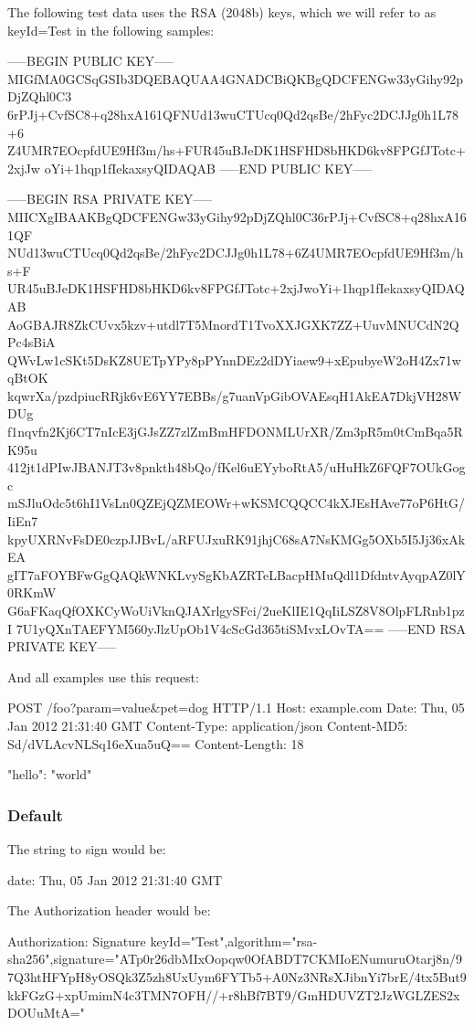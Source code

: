 The following test data uses the R\+S\+A (2048b) keys, which we will refer to as {\ttfamily key\+Id=Test} in the following samples\+: \begin{DoxyVerb}-----BEGIN PUBLIC KEY-----
MIGfMA0GCSqGSIb3DQEBAQUAA4GNADCBiQKBgQDCFENGw33yGihy92pDjZQhl0C3
6rPJj+CvfSC8+q28hxA161QFNUd13wuCTUcq0Qd2qsBe/2hFyc2DCJJg0h1L78+6
Z4UMR7EOcpfdUE9Hf3m/hs+FUR45uBJeDK1HSFHD8bHKD6kv8FPGfJTotc+2xjJw
oYi+1hqp1fIekaxsyQIDAQAB
-----END PUBLIC KEY-----

-----BEGIN RSA PRIVATE KEY-----
MIICXgIBAAKBgQDCFENGw33yGihy92pDjZQhl0C36rPJj+CvfSC8+q28hxA161QF
NUd13wuCTUcq0Qd2qsBe/2hFyc2DCJJg0h1L78+6Z4UMR7EOcpfdUE9Hf3m/hs+F
UR45uBJeDK1HSFHD8bHKD6kv8FPGfJTotc+2xjJwoYi+1hqp1fIekaxsyQIDAQAB
AoGBAJR8ZkCUvx5kzv+utdl7T5MnordT1TvoXXJGXK7ZZ+UuvMNUCdN2QPc4sBiA
QWvLw1cSKt5DsKZ8UETpYPy8pPYnnDEz2dDYiaew9+xEpubyeW2oH4Zx71wqBtOK
kqwrXa/pzdpiucRRjk6vE6YY7EBBs/g7uanVpGibOVAEsqH1AkEA7DkjVH28WDUg
f1nqvfn2Kj6CT7nIcE3jGJsZZ7zlZmBmHFDONMLUrXR/Zm3pR5m0tCmBqa5RK95u
412jt1dPIwJBANJT3v8pnkth48bQo/fKel6uEYyboRtA5/uHuHkZ6FQF7OUkGogc
mSJluOdc5t6hI1VsLn0QZEjQZMEOWr+wKSMCQQCC4kXJEsHAve77oP6HtG/IiEn7
kpyUXRNvFsDE0czpJJBvL/aRFUJxuRK91jhjC68sA7NsKMGg5OXb5I5Jj36xAkEA
gIT7aFOYBFwGgQAQkWNKLvySgKbAZRTeLBacpHMuQdl1DfdntvAyqpAZ0lY0RKmW
G6aFKaqQfOXKCyWoUiVknQJAXrlgySFci/2ueKlIE1QqIiLSZ8V8OlpFLRnb1pzI
7U1yQXnTAEFYM560yJlzUpOb1V4cScGd365tiSMvxLOvTA==
-----END RSA PRIVATE KEY-----
\end{DoxyVerb}


And all examples use this request\+: \begin{DoxyVerb}POST /foo?param=value&pet=dog HTTP/1.1
Host: example.com
Date: Thu, 05 Jan 2012 21:31:40 GMT
Content-Type: application/json
Content-MD5: Sd/dVLAcvNLSq16eXua5uQ==
Content-Length: 18

{"hello": "world"}
\end{DoxyVerb}


\subsubsection*{Default}

The string to sign would be\+: \begin{DoxyVerb}date: Thu, 05 Jan 2012 21:31:40 GMT
\end{DoxyVerb}


The Authorization header would be\+: \begin{DoxyVerb}Authorization: Signature keyId="Test",algorithm="rsa-sha256",signature="ATp0r26dbMIxOopqw0OfABDT7CKMIoENumuruOtarj8n/97Q3htHFYpH8yOSQk3Z5zh8UxUym6FYTb5+A0Nz3NRsXJibnYi7brE/4tx5But9kkFGzG+xpUmimN4c3TMN7OFH//+r8hBf7BT9/GmHDUVZT2JzWGLZES2xDOUuMtA="
\end{DoxyVerb}


